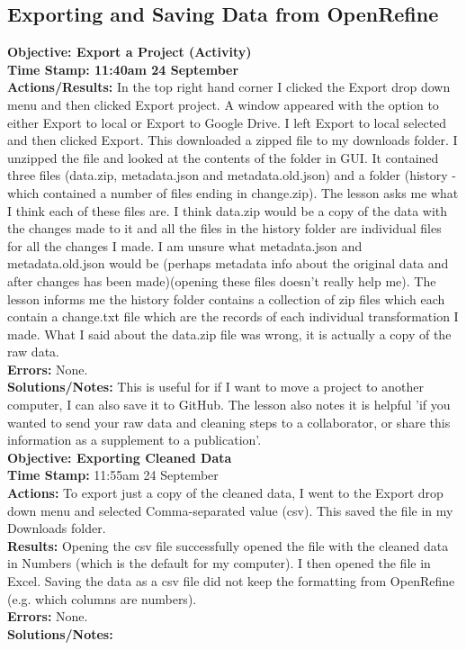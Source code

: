\documentclass{article}
\begin{document}
\begin{FlushLeft}
\subsection{Exporting and Saving Data from OpenRefine}
\textbf{Objective: Export a Project (Activity)}\\ 
\textbf{Time Stamp: 11:40am 24 September} \\
\textbf{Actions/Results:} In the top right hand corner I clicked the Export drop down menu and then clicked Export project. A window appeared with the option to either Export to local or Export to Google Drive. I left Export to local selected and then clicked Export. This downloaded a zipped file to my downloads folder. I unzipped the file and looked at the contents of the folder in GUI. It contained three files (data.zip, metadata.json and metadata.old.json) and a folder (history - which contained a number of files ending in change.zip). The lesson asks me what I think each of these files are. I think data.zip would be a copy of the data with the changes made to it and all the files in the history folder are individual files for all the changes I made. I am unsure what metadata.json and metadata.old.json would be (perhaps metadata info about the original data and after changes has been made)(opening these files doesn't really help me). The lesson informs me the history folder contains a collection of zip files which each contain a change.txt file which are the records of each individual transformation I made. What I said about the data.zip file was wrong, it is actually a copy of the raw data.\\
\textbf{Errors:} None.\\
\textbf{Solutions/Notes:} This is useful for if I want to move a project to another computer, I can also save it to GitHub. The lesson also notes it is helpful 'if you wanted to send your raw data and cleaning steps to a collaborator, or share this information as a supplement to a publication'.\\
\vspace{5mm}
\textbf{Objective: Exporting Cleaned Data}\\ 
\textbf{Time Stamp:} 11:55am 24 September \\
\textbf{Actions:} To export just a copy of the cleaned data, I went to the Export drop down menu and selected Comma-separated value (csv). This saved the file in my Downloads folder.\\
\textbf{Results:} Opening the csv file successfully opened the file with the cleaned data in Numbers (which is the default for my computer). I then opened the file in Excel. Saving the data as a csv file did not keep the formatting from OpenRefine (e.g. which columns are numbers).\\
\textbf{Errors:} None.\\
\textbf{Solutions/Notes:}\\
\vspace{5mm}


\end{FlushLeft}
\end{document}
